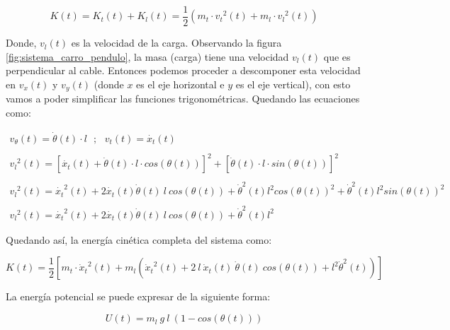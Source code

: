 \documentclass[11pt]{article}
\begin{document}
\begin{equation}
	\label{eq:lagrangiano_energia_cinetica}
	K(t)=K_{t}(t)+K_{l}(t)=\frac{1}{2}\left ( m_{t}\cdot {v_{t}}^2(t)+m_{l}\cdot {v_{l}}^2(t) \right )
\end{equation}

Donde, $v_{l}(t)$ es la velocidad de la carga. Observando la figura \ref{fig:sistema_carro_pendulo}, la masa (carga) tiene una velocidad $v_{l}(t)$ que es perpendicular al cable. Entonces podemos proceder a descomponer esta velocidad en $v_{x}(t)$ y $v_{y}(t)$ (donde $x$ es el eje horizontal e $y$ es el eje vertical), con esto vamos a poder simplificar las funciones trigonométricas. Quedando las ecuaciones como:

\begin{equation}
	\label{eq:lagrangiano_velocidades_energia_cinetica}
	\begin{matrix}v_{\theta }(t)=\dot{\theta }(t)\cdot l\ \ \ ;\ \ \ v_{t}(t)=\dot{x_{t}}(t) \\ \\ {v_{l}}^{2}(t)=\left [ \dot{x_{t}}(t)+\dot{\theta }(t)\cdot l\cdot cos\left ( \theta (t) \right ) \right ]^{2} + \left [ \dot{\theta }(t)\cdot l\cdot sin\left ( \theta (t) \right ) \right ]^{2} \\ \\ {v_{l}}^{2}(t)= {\dot{x_{t}}}^{2}(t)+2\dot{x_{t}}(t)\dot{\theta }(t)\:l\:cos(\theta (t))+ {\dot{\theta}}^{2}(t)l^{2}cos(\theta (t))^{2}+ {\dot{\theta}}^{2}(t)l^{2}sin(\theta (t))^{2}\\ \\ {v_{l}}^{2}(t)={\dot{x_{t}}}^{2}(t)+2\dot{x_{t}}(t)\dot{\theta }(t)\:l\:cos(\theta (t))+ {\dot{\theta}}^{2}(t)l^{2}\end{matrix}
\end{equation}

Quedando así, la energía cinética completa del sistema como:

\begin{equation}
	\label{eq:lagrangiano_energia_cinetica_completa}
	K(t)=\frac{1}{2}\left [ m_{t}\cdot {\dot{x}_{t}}^{2}(t)+m_{l} \left ( {\dot{x}_{t}}^{2}(t)+2\ l\ \dot{x}_{t}(t)\ \dot{\theta}(t)\ cos(\theta(t))+ {l}^2 {\dot{\theta}}^{2}(t) \right ) \right ]
\end{equation}

La energía potencial se puede expresar de la siguiente forma:

\begin{equation}
	\label{eq:lagrangiano_energia_potencial}
	U(t)=m_{l}\ g\ l\ (1-cos(\theta (t)))
\end{equation}
\end{document}
